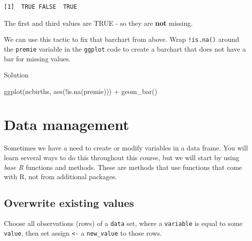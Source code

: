 \documentclass[
  letterpaper,
  DIV=11,
  numbers=noendperiod,
  oneside]{scrreprt}
\newenvironment{Shaded}{\begin{snugshade}}{\end{snugshade}}
\newcommand{\FunctionTok}[1]{\textcolor[rgb]{0.28,0.35,0.67}{#1}}
\newcommand{\NormalTok}[1]{\textcolor[rgb]{0.00,0.23,0.31}{#1}}
\newcommand{\SpecialCharTok}[1]{\textcolor[rgb]{0.37,0.37,0.37}{#1}}
\begin{document}
\begin{verbatim}
[1]  TRUE FALSE  TRUE
\end{verbatim}

The first and third values are TRUE - so they are \textbf{not} missing.

\begin{tcolorbox}[enhanced jigsaw, bottomrule=.15mm, colback=white, colframe=quarto-callout-tip-color-frame, toprule=.15mm, coltitle=black, rightrule=.15mm, opacitybacktitle=0.6, colbacktitle=quarto-callout-tip-color!10!white, toptitle=1mm, leftrule=.75mm, breakable, bottomtitle=1mm, titlerule=0mm, title={👉 Hide the NA bar}, arc=.35mm, left=2mm, opacityback=0]

We can use this tactic to fix that barchart from above. Wrap
\texttt{!is.na()} around the \texttt{premie} variable in the
\texttt{ggplot} code to create a barchart that does not have a bar for
missing values.

Solution

\begin{Shaded}
\begin{Highlighting}[]
\FunctionTok{ggplot}\NormalTok{(ncbirths, }\FunctionTok{aes}\NormalTok{(}\SpecialCharTok{!}\FunctionTok{is.na}\NormalTok{(premie))) }\SpecialCharTok{+} \FunctionTok{geom\_bar}\NormalTok{()}
\end{Highlighting}
\end{Shaded}

\end{tcolorbox}

\section{Data management}\label{data-management}

Sometimes we have a need to create or modify variables in a data frame.
You will learn several ways to do this throughout this course, but we
will start by using \emph{base R} functions and methods. These are
methods that use functions that come with R, not from additional
packages.

\subsection{Overwrite existing values}\label{overwrite-existing-values}

Choose all observations (rows) of a \texttt{data} set, where a
\texttt{variable} is equal to some \texttt{value}, then set assign
\texttt{\textless{}-} a \texttt{new\_value} to those rows.
\end{document}
